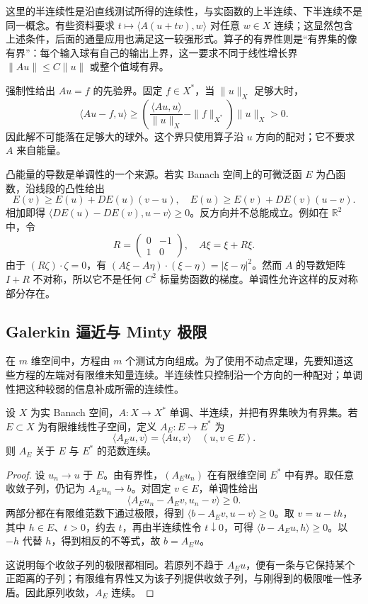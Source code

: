 这里的半连续性是沿直线测试所得的连续性，与实函数的上半连续、下半连续不是同一概念。有些资料要求 \(t\mapsto\langle A(u+tv),w\rangle\) 对任意 \(w\in X\) 连续；这显然包含上述条件，后面的通量应用也满足这一较强形式。算子的有界性则是“有界集的像有界”：每个输入球有自己的输出上界，这一要求不同于线性增长界 \(\|Au\|\le C\|u\|\) 或整个值域有界。

\ProseParagraphBreak

强制性给出 \(Au=f\) 的先验界。固定 \(f\in X^*\)，当 \(\|u\|_X\) 足够大时，
\[
 \langle Au-f,u\rangle
 \ge\left(\frac{\langle Au,u\rangle}{\|u\|_X}
                    -\|f\|_{X^*}\right)\|u\|_X>0.
\]
因此解不可能落在足够大的球外。这个界只使用算子沿 \(u\) 方向的配对；它不要求 \(A\) 来自能量。

\ProseParagraphBreak

凸能量的导数是单调性的一个来源。若实 Banach 空间上的可微泛函 \(E\) 为凸函数，沿线段的凸性给出
\[
 E(v)\ge E(u)+DE(u)(v-u),
 \quad E(u)\ge E(v)+DE(v)(u-v).
\]
相加即得 \(\langle DE(u)-DE(v),u-v\rangle\ge0\)。反方向并不总能成立。例如在 \(\mathbb R^2\) 中，令
\[
 R=\begin{pmatrix}0&-1\\1&0\end{pmatrix},
 \quad A\xi=\xi+R\xi.
\]
由于 \((R\zeta)\cdot\zeta=0\)，有
\((A\xi-A\eta)\cdot(\xi-\eta)=|\xi-\eta|^2\)。然而 \(A\) 的导数矩阵 \(I+R\) 不对称，所以它不是任何 \(C^2\) 标量势函数的梯度。单调性允许这样的反对称部分存在。

\subsection{Galerkin 逼近与 Minty 极限}
\label{b2:subsec:H20402}

在 \(m\) 维空间中，方程由 \(m\) 个测试方向组成。为了使用不动点定理，先要知道这些方程的左端对有限维未知量连续。半连续性只控制沿一个方向的一种配对；单调性把这种较弱的信息补成所需的连续性。

\begin{lemma}[有限维限制的连续性]\label{b2:lem:H4-finite-continuity}
设 \(X\) 为实 Banach 空间，\(A:X\to X^*\) 单调、半连续，并把有界集映为有界集。若 \(E\subset X\) 为有限维线性子空间，定义 \(A_E:E\to E^*\) 为
\[
 \langle A_Eu,v\rangle=\langle Au,v\rangle
 \quad(u,v\in E).
\]
则 \(A_E\) 关于 \(E\) 与 \(E^*\) 的范数连续。
\end{lemma}
\begin{proof}
设 \(u_n\to u\) 于 \(E\)。由有界性，\((A_Eu_n)\) 在有限维空间 \(E^*\) 中有界。取任意收敛子列，仍记为 \(A_Eu_n\to b\)。对固定 \(v\in E\)，单调性给出
\[
 \langle A_Eu_n-A_Ev,u_n-v\rangle\ge0.
\]
两部分都在有限维范数下通过极限，得到
\(\langle b-A_Ev,u-v\rangle\ge0\)。取 \(v=u-th\)，其中 \(h\in E\)、\(t>0\)，约去 \(t\)，再由半连续性令 \(t\downarrow0\)，可得
\(\langle b-A_Eu,h\rangle\ge0\)。以 \(-h\) 代替 \(h\)，得到相反的不等式，故 \(b=A_Eu\)。

这说明每个收敛子列的极限都相同。若原列不趋于 \(A_Eu\)，便有一条与它保持某个正距离的子列；有限维有界性又为该子列提供收敛子列，与刚得到的极限唯一性矛盾。因此原列收敛，\(A_E\) 连续。
\end{proof}

